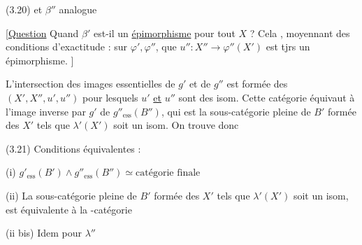 (3.20)
et $\beta''$ analogue

[\uline{Question} Quand $\beta'$ est-il un \uline{épimorphisme} pour tout $X$ ? Cela  , moyennant des conditions d'exactitude :   sur $\varphi',\varphi''$, que $u'':X''\longrightarrow\varphi''(X')$ est tjrs un épimorphisme. ]

L'intersection des images essentielles de $g'$ et de $g''$ est formée des $(X',X'',u',u'')$ pour lesquels $u'$ \uline{et} $u''$ sont des isom.  Cette catégorie équivaut à l'image inverse par $g'$ de $g''_{\mathrm{ess}}(B'')$, qui est la sous-catégorie  pleine de $B'$ formée des $X'$ tels que $\lambda'(X')$ soit un isom. On trouve donc

(3.21) Conditions équivalentes :

(i) $g'_{\mathrm{ess}}(B')\wedge g''_{\mathrm{ess}}(B'')\simeq\text{catégorie finale}$

(ii) La sous-catégorie pleine de $B'$ formée des $X'$ tels que $\lambda'(X')$ soit un isom, est équivalente à la -catégorie 

(ii bis) Idem pour $\lambda''$
